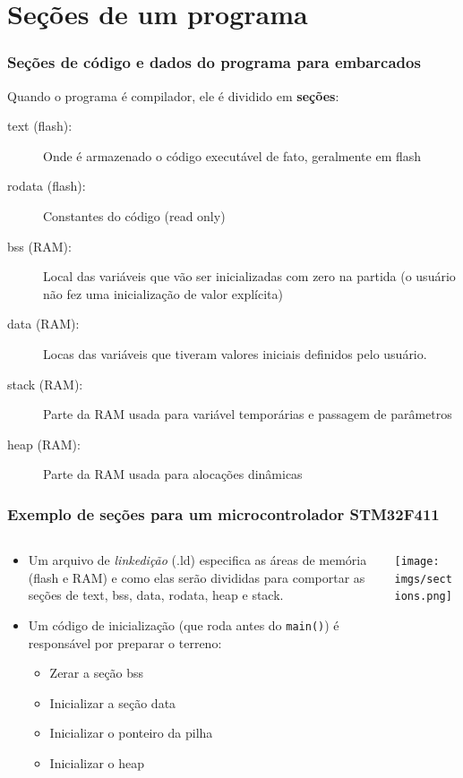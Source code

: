 \documentclass{beamer}
\begin{document}
\section{Seções de um programa}

\begin{frame}
	\frametitle{Seções de código e dados do programa para embarcados}
    Quando o programa é compilador, ele é dividido em \textbf{seções}:
    \vspace*{0.5cm}
    \begin{description}
    \item[text (flash):] Onde é armazenado o código executável de fato, geralmente em flash
    \item[rodata (flash):] Constantes do código (read only)
    \item[bss (RAM):] Local das variáveis que vão ser inicializadas com zero na partida (o usuário não fez uma inicialização de valor explícita)
    \item[data (RAM):] Locas das variáveis que tiveram valores iniciais definidos pelo usuário.
    \item[stack (RAM):] Parte da RAM usada para variável temporárias e passagem de parâmetros
    \item[heap (RAM):] Parte da RAM usada para alocações dinâmicas
    \end{description}
\end{frame}

\begin{frame}
	\frametitle{Exemplo de seções para um microcontrolador STM32F411}
	\begin{columns}[T] %
	\begin{column}{.60\textwidth}
	\begin{itemize}
		\item Um arquivo de \textit{linkedição} (.ld) especifica as áreas de memória (flash e RAM) e como elas serão divididas para comportar as seções de text, bss, data, rodata, heap e stack.
        \item Um código de inicialização (que roda antes do \texttt{main()}) é responsável por preparar o terreno:
        	\begin{itemize}
        		\item Zerar a seção bss
                \item Inicializar a seção data
                \item Inicializar o ponteiro da pilha
                \item Inicializar o heap
        	\end{itemize}
	\end{itemize}
	\end{column}%
	\hfill%
	\begin{column}{.40\textwidth}
        \texttt{[image: imgs/sections.png]}
	\end{column}%
\end{columns}
\end{frame}
\end{document}
